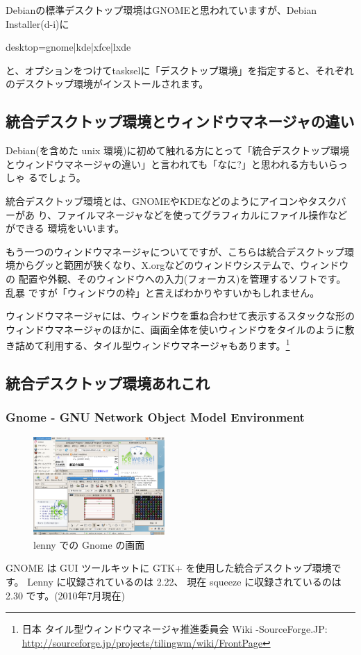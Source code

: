 \documentclass[mingoth,a4paper]{jsarticle}
\begin{document}
Debianの標準デスクトップ環境はGNOMEと思われていますが、Debian
Installer(d-i)に
%
\begin{commandline}
 desktop=gnome|kde|xfce|lxde
\end{commandline}
%
\noindent
と、オプションをつけてtaskselに「デスクトップ環境」を指定すると、それぞれ
のデスクトップ環境がインストールされます。

\subsection{統合デスクトップ環境とウィンドウマネージャの違い}

Debian(を含めた unix 環境)に初めて触れる方にとって「統合デスクトップ環境
とウィンドウマネージャの違い」と言われても「なに?」と思われる方もいらっしゃ
るでしょう。

統合デスクトップ環境とは、GNOMEやKDEなどのようにアイコンやタスクバーがあ
り、ファイルマネージャなどを使ってグラフィカルにファイル操作などができる
環境をいいます。

もう一つのウィンドウマネージャについてですが、こちらは統合デスクトップ環
境からグッと範囲が狭くなり、X.orgなどのウィンドウシステムで、ウィンドウの
配置や外観、そのウィンドウへの入力(フォーカス)を管理するソフトです。乱暴
ですが「ウィンドウの枠」と言えばわかりやすいかもしれません。

ウィンドウマネージャには、ウィンドウを重ね合わせて表示するスタックな形の
ウィンドウマネージャのほかに、画面全体を使いウィンドウをタイルのように敷
き詰めて利用する、タイル型ウィンドウマネージャもあります。\footnote{日本
タイル型ウィンドウマネージャ推進委員会 Wiki -SourceForge.JP:\\
\url{http://sourceforge.jp/projects/tilingwm/wiki/FrontPage}}

\subsection{統合デスクトップ環境あれこれ}

\subsubsection{Gnome - GNU Network Object Model Environment}
\begin{figure}
    \begin{center}
        \includegraphics[width=5cm]{image201004/gnome.png}
        \caption{lenny での Gnome の画面}
    \end{center}
\end{figure}
GNOME は GUI ツールキットに GTK+ を使用した統合デスクトップ環境です。
Lenny に収録されているのは 2.22、
現在 squeeze に収録されているのは 2.30 です。(2010年7月現在)
\end{document}
